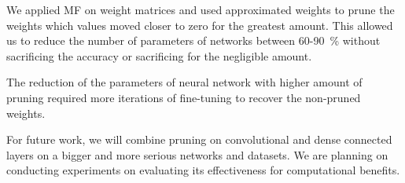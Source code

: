 \documentclass{article} %
\begin{document}
We applied MF on weight matrices and used 
approximated weights to prune the weights which values moved closer to zero for 
the greatest amount. This allowed us to reduce the number of parameters of 
networks between 60-90~\% without sacrificing the accuracy or sacrificing for 
the negligible amount. 

The reduction of the parameters of neural network with 
higher amount of pruning required more iterations of fine-tuning to recover the 
non-pruned 
weights. 

For future work, we will combine pruning on convolutional and dense connected 
layers on a bigger and more serious networks and datasets.
We are planning on conducting experiments on evaluating its effectiveness for 
computational benefits.





\end{document}
